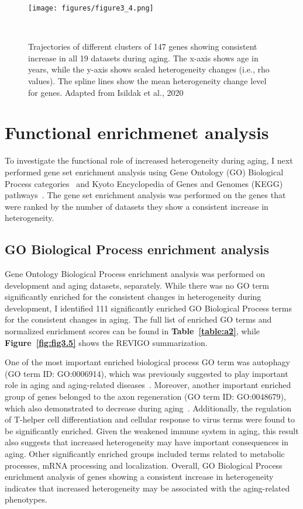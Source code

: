 \begin{figure}[h]
    \centering
    \texttt{[image: figures/figure3\_4.png]}
    \caption{Trajectories of different clusters of 147 genes showing consistent increase in all 19 datasets during aging.
    The x-axis shows age in years, while the y-axis shows scaled heterogeneity changes (i.e., rho values).
    The spline lines show the mean heterogeneity change level for genes. 
    Adapted from Isildak et al., 2020
    }~\label{fig:fig3.4}
\end{figure}

\section{Functional enrichmenet analysis}
To investigate the functional role of increased heterogeneity during aging, 
I next performed gene set enrichment analysis using Gene Ontology (GO) Biological Process categories~\cite{GO2019} and Kyoto Encyclopedia of Genes and Genomes (KEGG) pathways~\cite{Kanehisa2019}.
The gene set enrichment analysis was performed on the genes that were ranked by the number of datasets they show a consistent increase in heterogeneity. 

\subsection{GO Biological Process enrichment analysis}
Gene Ontology Biological Process enrichment analysis was performed on development and aging datasets, separately. 
While there was no GO term significantly enriched for the consistent changes in heterogeneity during development, 
I identified 111 significantly enriched GO Biological Process terms for the consistent changes in aging. 
The full list of enriched GO terms and normalized enrichment scores can be found in \textbf{Table~\ref{table:a2}}, 
while \textbf{Figure~\ref{fig:fig3.5}} shows the REVIGO summarization.

One of the most important enriched biological process GO term was autophagy (GO term ID: GO:0006914), which was previously suggested to play important role in aging and aging-related diseases~\cite{Rubinsztein2011}.
Moreover, another important enriched group of genes belonged to the axon regeneration (GO term ID: GO:0048679), which also demonstrated to decrease during aging~\cite{Belin2014}.
Additionally, the regulation of T-helper cell differentiation and cellular response to virus terms were found to be significantly enriched. 
Given the weakened immune system in aging, this result also suggests that increased heterogeneity may have important consequences in aging.
Other significantly enriched groups included terms related to metabolic processes, mRNA processing and localization.
Overall, GO Biological Process enrichment analysis of genes showing a consistent increase in heterogeneity indicates that increased heterogeneity may be associated with the aging-related phenotypes.

